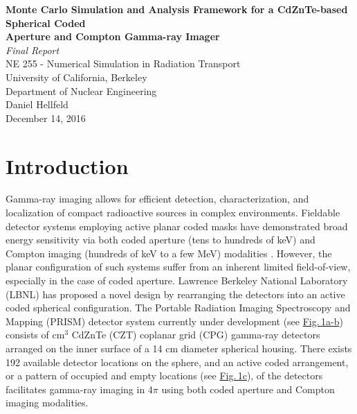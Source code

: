 \documentclass[10pt]{article}
\begin{document}
\begin{centering}
\textbf{Monte Carlo Simulation and Analysis Framework for a CdZnTe-based Spherical Coded\\[-5pt] Aperture and Compton Gamma-ray Imager}\\
\vspace{5pt}
\emph{Final Report}\\
\vspace{5pt}
NE 255 - Numerical Simulation in Radiation Transport \\[-5pt]
University of California, Berkeley \\[-5pt]
Department of Nuclear Engineering\\
\vspace{5pt}
Daniel Hellfeld\\
\vspace{5pt}
December 14, 2016 \\
\end{centering}


\section{Introduction}

Gamma-ray imaging allows for efficient detection, characterization, and localization of compact radioactive sources in complex environments. Fieldable detector systems employing active planar coded masks have demonstrated broad energy sensitivity via both coded aperture (tens to hundreds of keV) and Compton imaging (hundreds of keV to a few MeV) modalities \cite{Galloway2011}. However, the planar configuration of such systems suffer from an inherent limited field-of-view, especially in the case of coded aperture. Lawrence Berkeley National Laboratory (LBNL) has proposed a novel design by rearranging the detectors into an active coded spherical configuration. The Portable Radiation Imaging Spectroscopy and Mapping (PRISM) detector system currently under development (see \hyperlink{fig1}{Fig.\,1a-b}) consists of cm$^3$ CdZnTe (CZT) coplanar grid (CPG) \cite{Luke1995} gamma-ray detectors arranged on the inner surface of a 14 cm diameter spherical housing. There exists 192 available detector locations on the sphere, and an active coded arrangement, or a pattern of occupied and empty locations (see \hyperlink{fig1}{Fig.\,1c}), of the detectors facilitates gamma-ray imaging in 4$\pi$ using both coded aperture and Compton imaging modalities.
\end{document}
